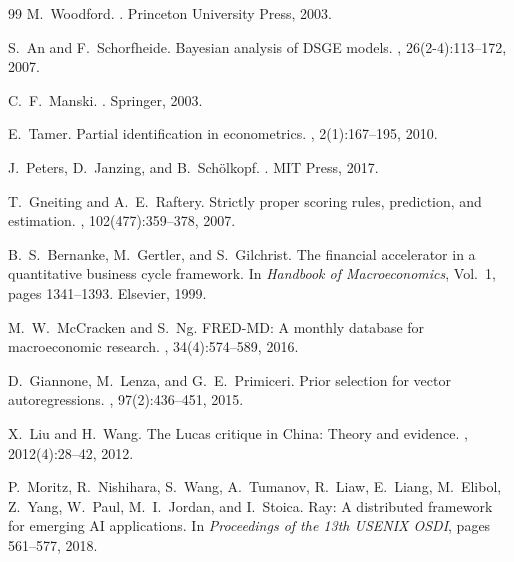 \documentclass[12pt,a4paper]{article}
\begin{document}
\begin{thebibliography}{99}
M.~Woodford.
.
\newblock Princeton University Press, 2003.

S.~An and F.~Schorfheide.
\newblock Bayesian analysis of DSGE models.
, 26(2-4):113--172, 2007.

C.~F.~Manski.
.
\newblock Springer, 2003.

E.~Tamer.
\newblock Partial identification in econometrics.
, 2(1):167--195, 2010.

J.~Peters, D.~Janzing, and B.~Sch\"{o}lkopf.
.
\newblock MIT Press, 2017.

T.~Gneiting and A.~E.~Raftery.
\newblock Strictly proper scoring rules, prediction, and estimation.
,
102(477):359--378, 2007.

B.~S.~Bernanke, M.~Gertler, and S.~Gilchrist.
\newblock The financial accelerator in a quantitative business cycle
framework.
\newblock In {\em Handbook of Macroeconomics}, Vol.\ 1, pages 1341--1393.
Elsevier, 1999.

M.~W.~McCracken and S.~Ng.
\newblock FRED-MD: A monthly database for macroeconomic research.
, 34(4):574--589,
2016.

D.~Giannone, M.~Lenza, and G.~E.~Primiceri.
\newblock Prior selection for vector autoregressions.
, 97(2):436--451, 2015.

X.~Liu and H.~Wang.
\newblock The Lucas critique in China: Theory and evidence.
, 2012(4):28--42, 2012.

P.~Moritz, R.~Nishihara, S.~Wang, A.~Tumanov, R.~Liaw, E.~Liang,
M.~Elibol, Z.~Yang, W.~Paul, M.~I.~Jordan, and I.~Stoica.
\newblock Ray: A distributed framework for emerging AI applications.
\newblock In {\em Proceedings of the 13th USENIX OSDI}, pages 561--577, 2018.

\end{thebibliography}
\end{document}
